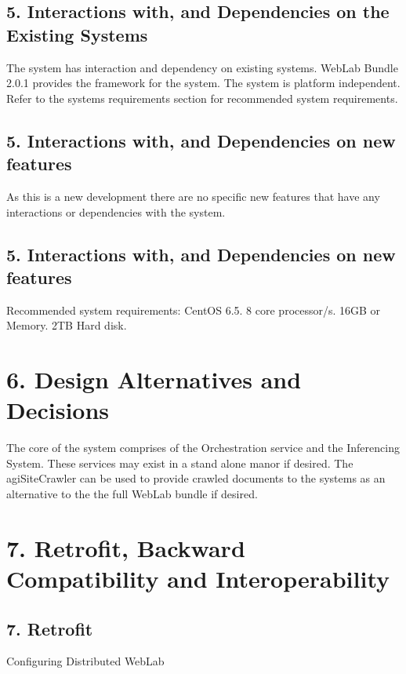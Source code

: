 \hypertarget{index_sec_5_1}{}\subsection{5.	\+Interactions with, and Dependencies on the Existing Systems}\label{index_sec_5_1}
\begin{DoxyVerb}The system has interaction and dependency on existing systems.
WebLab Bundle 2.0.1 provides the framework for the system.
The system is platform independent.  Refer to the systems requirements section for recommended system requirements.
\end{DoxyVerb}
\hypertarget{index_sec_5_2}{}\subsection{5. Interactions with, and Dependencies on new features}\label{index_sec_5_2}
\begin{DoxyVerb}As this is a new development there are no specific new features that have any interactions or
dependencies with the system.  
\end{DoxyVerb}
\hypertarget{index_sec_5_2}{}\subsection{5. Interactions with, and Dependencies on new features}\label{index_sec_5_2}
\begin{DoxyVerb}Recommended system requirements:
  CentOS 6.5.
  8 core processor/s.
  16GB or Memory.
  2TB Hard disk.
\end{DoxyVerb}
\hypertarget{index_sec_6}{}\section{6.	\+Design Alternatives and Decisions}\label{index_sec_6}
\begin{DoxyVerb}The core of the system comprises of the Orchestration service and the Inferencing System.  These services may
exist in a stand alone manor if desired.  The agiSiteCrawler can be used to provide crawled documents to the 
systems as an alternative to the the full WebLab bundle if desired.  
\end{DoxyVerb}
\hypertarget{index_sec_7}{}\section{7.	\+Retrofit, Backward Compatibility and Interoperability}\label{index_sec_7}
\hypertarget{index_sec_7_1}{}\subsection{7.	\+Retrofit}\label{index_sec_7_1}
Configuring Distributed Web\+Lab


